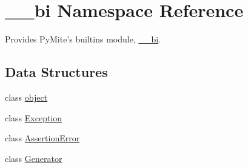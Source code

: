 \hypertarget{namespace____bi}{\section{\-\_\-\-\_\-bi Namespace Reference}
\label{namespace____bi}
}


Provides Py\-Mite's builtins module, \hyperlink{namespace____bi}{\-\_\-\-\_\-bi}.  


\subsection*{Data Structures}
\begin{DoxyCompactItemize}
\item 
class \hyperlink{class____bi_1_1object}{object}
\item 
class \hyperlink{class____bi_1_1_exception}{Exception}
\item 
class \hyperlink{class____bi_1_1_assertion_error}{Assertion\-Error}
\item 
class \hyperlink{class____bi_1_1_generator}{Generator}
\end{DoxyCompactItemize}
